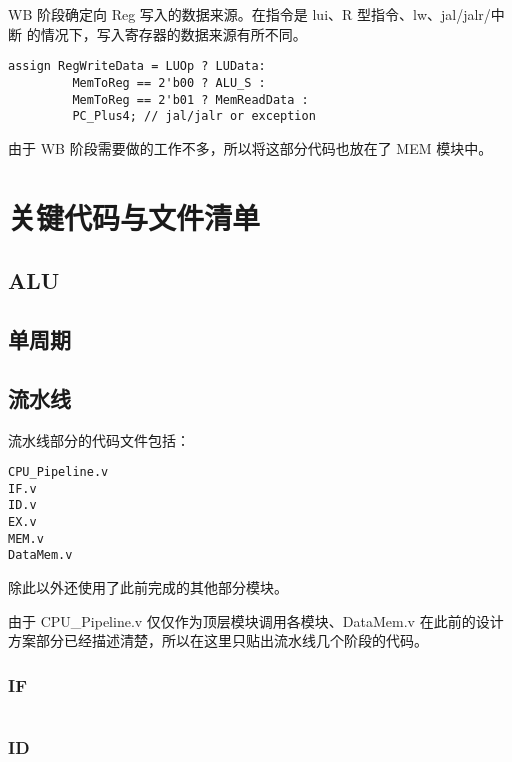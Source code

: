 \documentclass[a4paper]{article}
\begin{document}
WB 阶段确定向 Reg 写入的数据来源。在指令是 lui、R 型指令、lw、jal/jalr/中断 的情况下，写入寄存器的数据来源有所不同。

\begin{verbatim}
assign RegWriteData = LUOp ? LUData:
         MemToReg == 2'b00 ? ALU_S :
         MemToReg == 2'b01 ? MemReadData :
         PC_Plus4; // jal/jalr or exception
\end{verbatim}

由于 WB 阶段需要做的工作不多，所以将这部分代码也放在了 MEM 模块中。

\section{关键代码与文件清单}
\label{sec:关键代码与文件清单}

\subsection{ALU}
\label{sub:ALU}

\subsection{单周期}
\label{sub:单周期}

\subsection{流水线}
\label{sub:流水线}

流水线部分的代码文件包括：

\begin{verbatim}
CPU_Pipeline.v
IF.v
ID.v
EX.v
MEM.v
DataMem.v
\end{verbatim}

除此以外还使用了此前完成的其他部分模块。

由于 CPU\_Pipeline.v 仅仅作为顶层模块调用各模块、DataMem.v 在此前的设计方案部分已经描述清楚，所以在这里只贴出流水线几个阶段的代码。

\subsubsection{IF}
\label{subs:IF}

\inputminted[frame=single, linenos=true]{verilog}{}

\subsubsection{ID}
\label{subs:ID}
\end{document}
